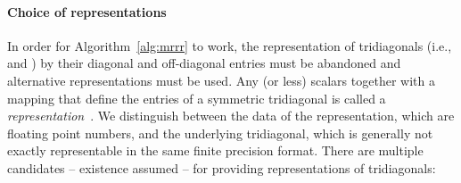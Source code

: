 \documentclass[final]{siamltex}
\begin{document}
\paragraph{Choice of representations}
In order for Algorithm~\ref{alg:mrrr} 
to work, the representation of tridiagonals (i.e.,  and
) by their diagonal and off-diagonal entries must be abandoned
and alternative representations must be used. Any  (or less) scalars
together with a mapping that define the entries of a symmetric tridiagonal
is called a {\it representation}~\cite{Willems:framework}. We distinguish 
between the data of the representation, which are floating point numbers,
and the underlying tridiagonal, which is generally not exactly representable
 in the same finite precision format. There are multiple candidates
-- existence assumed -- for providing representations of tridiagonals:
\end{document}

